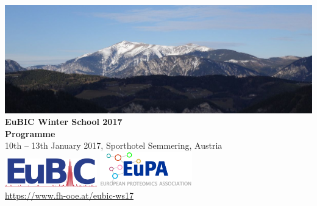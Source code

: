 \thispagestyle{empty}
\begin{titlepage}
	\begin{center}
    \includegraphics[width=\textwidth]{graphics/csm_fhooe-eubic-titelbild_small.jpg}\\
    \vspace*{\fill}
		{\huge \color{eubicRed} \textbf{EuBIC Winter School 2017}\\[1cm]}
    {\LARGE \textbf{Programme}\\[1cm]}
    {\color{eubicGray} 10th -- 13th January 2017, Sporthotel Semmering, Austria}\\
    \vspace*{3cm}
    \includegraphics[width=0.3\textwidth]{graphics/eubic_logo.png}
    \hspace*{2cm}
    \includegraphics[width=0.3\textwidth]{graphics/eupa-logo.png}\\[1cm]
    {\href{https://www.fh-ooe.at/eubic-ws17}{https://www.fh-ooe.at/eubic-ws17}\\[0.5cm]}
	\end{center}
  \vspace*{\fill}
\end{titlepage}
